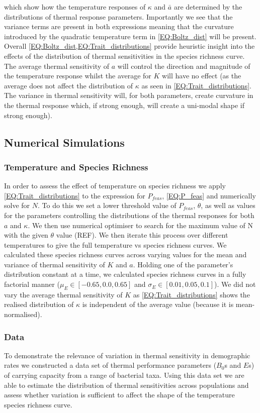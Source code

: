 \documentclass{article}
\begin{document}
which show how the temperature responses of $\kappa$ and $\bar{a}$ are determined by the distributions of thermal response parameters. Importantly we see that the variance terms are present in both expressions meaning that the curvature introduced by the quadratic temperature term in \cref{EQ:Boltz_dist} will be present. Overall \cref{EQ:Boltz_dist,EQ:Trait_distributions} provide heuristic insight into the effects of the distribution of thermal sensitivities in the species richness curve. The average thermal sensitivity of $a$ will control the direction and magnitude of the temperature response whilst the average for $K$ will have no effect (as the average does not affect the distribution of $\kappa$ as seen in \cref{EQ:Trait_distributions}. The variance in thermal sensitivity will, for both parameters, create curvature in the thermal response which, if strong enough, will create a uni-modal shape if strong enough). 

\subsection{Numerical Simulations}
\subsubsection{Temperature and Species Richness} \label{SEC:Temp_SP_num}
In order to assess the effect of temperature on species richness we apply \cref{EQ:Trait_distributions} to the expression for $P_{feas}$, \cref{EQ:P_feas} and numerically solve for $N$. To do this we set a lower threshold value of $P_{feas}$, $\theta$, as well as values for the parameters controlling the distributions of the thermal responses for both $a$ and $\kappa$. We then use numerical optimiser to search for the maximum value of N with the given $\theta$ value (REF). We then iterate this process over different temperatures to give the full temperature vs species richness curves. We calculated these species richness curves across varying values for the mean and variance of thermal sensitivity of $K$ and $a$. Holding one of the parameter's distribution constant at a time, we calculated species richness curves in a fully factorial manner ($\mu_{E} \in [-0.65, 0.0, 0.65]$ and $\sigma_{E} \in [0.01, 0.05, 0.1]$). We did not vary the average thermal sensitivity of $K$ as \cref{EQ:Trait_distributions} shows the realised distribution of $\kappa$ is independent of the average value (because it is mean-normalised). 

\subsubsection{Data}
To demonstrate the relevance of variation in thermal sensitivity in demographic rates we constructed a data set of thermal performance parameters ($B_0$s and $E$s) of carrying capacity from a range of bacterial taxa. Using this data set we are able to estimate the distribution of thermal sensitivities across populations and assess whether variation is sufficient to affect the shape of the temperature species richness curve. 
\end{document}
